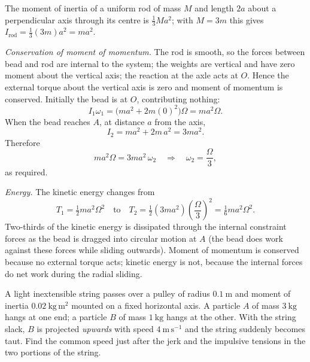 \documentclass[11pt]{article}
\begin{document}
\begin{corrige}[Exercise 1]
The moment of inertia of a uniform rod of mass $M$ and length $2a$ about a perpendicular axis through its centre is $\tfrac13 Ma^{2}$; with $M = 3m$ this gives $I_{\text{rod}} = \tfrac13(3m)a^{2} = ma^{2}$.

\emph{Conservation of moment of momentum.} The rod is smooth, so the forces between bead and rod are internal to the system; the weights are vertical and have zero moment about the vertical axis; the reaction at the axle acts at $O$. Hence the external torque about the vertical axis is zero and moment of momentum is conserved. Initially the bead is at $O$, contributing nothing:
\[
I_1\omega_1 = \big(ma^{2} + 2m(0)^{2}\big)\Omega = ma^{2}\Omega .
\]
When the bead reaches $A$, at distance $a$ from the axis,
\[
I_2 = ma^{2} + 2m\,a^{2} = 3ma^{2}.
\]
Therefore
\[
ma^{2}\Omega = 3ma^{2}\,\omega_2
\quad\Longrightarrow\quad
\omega_2 = \frac{\Omega}{3},
\]
as required.

\emph{Energy.} The kinetic energy changes from
\[
T_1 = \tfrac12 ma^{2}\Omega^{2}
\quad\text{to}\quad
T_2 = \tfrac12 (3ma^{2})\left(\frac{\Omega}{3}\right)^{2} = \tfrac16 ma^{2}\Omega^{2}.
\]
Two-thirds of the kinetic energy is dissipated through the internal constraint forces as the bead is dragged into circular motion at $A$ (the bead does work against these forces while sliding outwards). Moment of momentum is conserved because no external torque acts; kinetic energy is not, because the internal forces do net work during the radial sliding.
\end{corrige}

\begin{exercice}
A light inextensible string passes over a pulley of radius $0.1\ \mathrm{m}$ and moment of inertia $0.02\ \mathrm{kg\,m^{2}}$ mounted on a fixed horizontal axis. A particle $A$ of mass $3\ \mathrm{kg}$ hangs at one end; a particle $B$ of mass $1\ \mathrm{kg}$ hangs at the other. With the string slack, $B$ is projected \emph{upwards} with speed $4\ \mathrm{m\,s^{-1}}$ and the string suddenly becomes taut. Find the common speed just after the jerk and the impulsive tensions in the two portions of the string.
\end{exercice}
\end{document}
